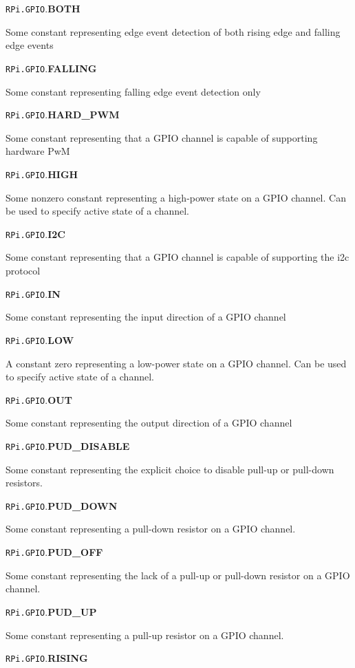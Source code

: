 \documentclass[12pt]{article}
\begin{document}
\noindent \texttt{RPi.GPIO}.\textbf{BOTH}

Some constant representing edge event detection of both rising edge and falling edge events

\noindent \texttt{RPi.GPIO}.\textbf{FALLING}

Some constant representing falling edge event detection only

\noindent \texttt{RPi.GPIO}.\textbf{HARD\_PWM}

Some constant representing that a GPIO channel is capable of supporting hardware PwM

\noindent \texttt{RPi.GPIO}.\textbf{HIGH}

Some nonzero constant representing a high-power state on a GPIO channel.
Can be used to specify active state of a channel.


\noindent \texttt{RPi.GPIO}.\textbf{I2C}

Some constant representing that a GPIO channel is capable of supporting the i2c protocol

\noindent \texttt{RPi.GPIO}.\textbf{IN}

Some constant representing the input direction of a GPIO channel

\noindent \texttt{RPi.GPIO}.\textbf{LOW}

A constant zero representing a low-power state on a GPIO channel.
Can be used to specify active state of a channel.

\noindent \texttt{RPi.GPIO}.\textbf{OUT}

Some constant representing the output direction of a GPIO channel

\noindent \texttt{RPi.GPIO}.\textbf{PUD\_DISABLE}

Some constant representing the explicit choice to disable pull-up or pull-down resistors.

\noindent \texttt{RPi.GPIO}.\textbf{PUD\_DOWN}

Some constant representing a pull-down resistor on a GPIO channel.

\noindent \texttt{RPi.GPIO}.\textbf{PUD\_OFF}

Some constant representing the lack of a pull-up or pull-down resistor on a GPIO channel.

\noindent \texttt{RPi.GPIO}.\textbf{PUD\_UP}

Some constant representing a pull-up resistor on a GPIO channel.

\noindent \texttt{RPi.GPIO}.\textbf{RISING}
\end{document}
